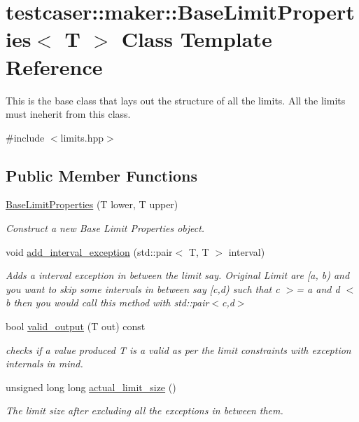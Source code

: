 \hypertarget{classtestcaser_1_1maker_1_1BaseLimitProperties}{}\section{testcaser\+:\+:maker\+:\+:Base\+Limit\+Properties$<$ T $>$ Class Template Reference}
\label{classtestcaser_1_1maker_1_1BaseLimitProperties}


This is the base class that lays out the structure of all the limits. All the limits must ineherit from this class.  




{\ttfamily \#include $<$limits.\+hpp$>$}

\subsection*{Public Member Functions}
\begin{DoxyCompactItemize}
\item 
\mbox{\hyperlink{classtestcaser_1_1maker_1_1BaseLimitProperties_a1022e529219cf4e212055bdbb25c4027}{Base\+Limit\+Properties}} (T lower, T upper)
\begin{DoxyCompactList}\small\item\em Construct a new Base Limit Properties object. \end{DoxyCompactList}\item 
void \mbox{\hyperlink{classtestcaser_1_1maker_1_1BaseLimitProperties_ae861156476caee223b806ea3d160040a}{add\+\_\+interval\+\_\+exception}} (std\+::pair$<$ T, T $>$ interval)
\begin{DoxyCompactList}\small\item\em Adds a interval exception in between the limit say. Original Limit are \mbox{[}a, b) and you want to skip some intervals in between say \mbox{[}c,d) such that c $>$= a and d $<$ b then you would call this method with std\+::pair$<$c,d$>$ \end{DoxyCompactList}\item 
bool \mbox{\hyperlink{classtestcaser_1_1maker_1_1BaseLimitProperties_a85f2967e2b73ff5fec2bc0053311d5e0}{valid\+\_\+output}} (T out) const
\begin{DoxyCompactList}\small\item\em checks if a value produced T is a valid as per the limit constraints with exception internals in mind. \end{DoxyCompactList}\item 
unsigned long long \mbox{\hyperlink{classtestcaser_1_1maker_1_1BaseLimitProperties_a1b8a120b2230476fc4fc97d4720fd3e5}{actual\+\_\+limit\+\_\+size}} ()
\begin{DoxyCompactList}\small\item\em The limit size after excluding all the exceptions in between them. \end{DoxyCompactList}\end{DoxyCompactItemize}
